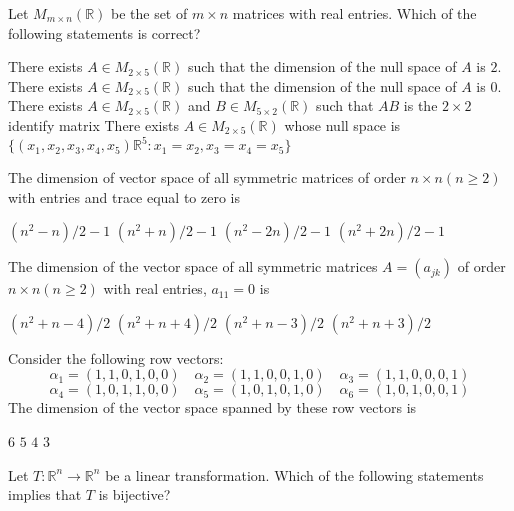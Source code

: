 \documentclass[10pt]{exam}
\newcommand{\R}{\ensuremath{\mathbb{R}}}
\begin{document}
\begin{questions}
\question
Let $M_{m \times n}(\mathbb{R})$ be the set of $m \times n$ matrices with real entries. Which of the following statements is correct?

\begin{choices}
\choice There exists $A \in M_{2 \times 5}(\mathbb{R})$ such that the dimension of the null space of $A$ is $2$.
\choice There exists $A \in M_{2 \times 5}(\mathbb{R})$ such that the dimension of the null space of $A$ is $0$.
\choice There exists $A \in M_{2 \times 5}(\mathbb{R})$ and $B \in M_{5 \times 2}(\mathbb{R})$ such that $AB$ is the $2 \times 2$ identify matrix 
\choice There exists $A \in M_{2 \times 5}(\mathbb{R})$ whose null space is $\{(x_1, x_2, x_3, x_4, x_5) \mathbb{R}^5:x_1 = x_2, x_3 = x_4 = x_5 \}$
\end{choices}

\question
The dimension of vector space of all symmetric matrices of order $n \times n(n \geq 2)$
with entries and trace equal to zero is

\begin{oneparchoices}
\choice $(n^2-n)/2-1$           
\choice $(n^2+n)/2-1$ 
\choice $(n^2-2n)/2-1$ 
\choice $(n^2+2n)/2-1$
\end{oneparchoices}

\question
The dimension of the vector space of all symmetric matrices $A=(a_{jk})$ of order $n\times n(n\geq 2)$ with real entries, $a_{11}=0$
is

\begin{oneparchoices}
\choice $(n^2+n-4)/2$
\choice $(n^2+n+4)/2$
\choice $(n^2+n-3)/2$
\choice $(n^2+n+3)/2$
\end{oneparchoices}


\question
Consider the following row vectors:
$$\alpha_1=(1,1,0,1,0,0)\quad \alpha_2=(1,1,0,0,1,0)\quad \alpha_3=(1,1,0,0,0,1)$$
$$\alpha_4=(1,0,1,1,0,0)\quad \alpha_5=(1,0,1,0,1,0)\quad \alpha_6=(1,0,1,0,0,1)$$
The dimension of the vector space spanned by these row vectors is

\begin{oneparchoices}
\choice $6$
\choice $5$
\choice $4$
\choice $3$
\end{oneparchoices}

\question
Let $T:\R^n \rightarrow \R^n$ be a linear transformation. Which of the following statements implies that $T$ is bijective?


\end{questions}
\end{document}
